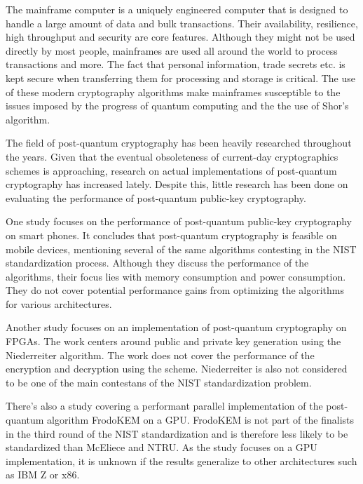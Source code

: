 The mainframe computer is a uniquely engineered computer that is designed to handle a large amount of data and bulk transactions. Their availability, resilience, high throughput and security are core features. Although they might not be used directly by most people, mainframes are used all around the world to process transactions and more. The fact that personal information, trade secrets etc. is kept secure when transferring them for processing and storage is critical. The use of these modern cryptography algorithms make mainframes susceptible to the issues imposed by the progress of quantum computing and the the use of Shor's algorithm.

The field of post-quantum cryptography has been heavily researched throughout the years. Given that the eventual obsoleteness of current-day cryptographics schemes is approaching, research on actual implementations of post-quantum cryptography has increased lately. Despite this, little research has been done on evaluating the performance of post-quantum public-key cryptography.

One study focuses on the performance of post-quantum public-key cryptography on smart phones. It concludes that post-quantum cryptography is feasible on mobile devices, mentioning several of the same algorithms contesting in the NIST standardization process. Although they discuss the performance of the algorithms, their focus lies with memory consumption and power consumption. They do not cover potential performance gains from optimizing the algorithms for various architectures.%

Another study focuses on an implementation of post-quantum cryptography on FPGAs. The work centers around public and private key generation using the Niederreiter algorithm. The work does not cover the performance of the encryption and decryption using the scheme. Niederreiter is also not considered to be one of the main contestans of the NIST standardization problem.%

There's also a study covering a performant parallel implementation of the post-quantum algorithm FrodoKEM on a GPU. FrodoKEM is not part of the finalists in the third round of the NIST standardization and is therefore less likely to be standardized than McEliece and NTRU\cite{nist2020}. As the study focuses on a GPU implementation, it is unknown if the results generalize to other architectures such as IBM Z or x86.%

